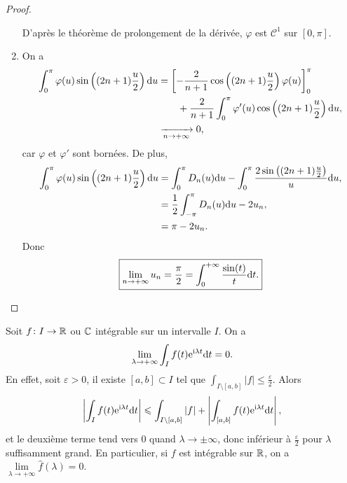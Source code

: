 \documentclass[12pt]{article}
\begin{document}
\begin{proof}
\begin{enumerate}
        D'après le théorème de prolongement de la dérivée, $\varphi$ est $\mathcal{C}^{1}$ sur $[0,\pi]$.

        \item On a 
        \begin{align*}
            \int_{0}^{\pi}\varphi(u)\sin\left((2n+1)\frac{u}{2}\right)\mathrm{d} u
            &=\left[-\frac{2}{n+1}\cos\left((2n+1)\frac{u}{2}\right)\varphi(u)\right]_{0}^{\pi}\nonumber\\
            &\qquad+\frac{2}{n+1}\int_{0}^{\pi}\varphi'(u)\cos\left((2n+1)\frac{u}{2}\right)\mathrm{d} u,\\
            &\xrightarrow[n\to+\infty]{}0,
        \end{align*}
        car $\varphi$ et $\varphi'$ sont bornées. De plus,
        \begin{align*}
            \int_{0}^{\pi}\varphi(u)\sin\left((2n+1)\frac{u}{2}\right)\mathrm{d} u
            &=\int_{0}^{\pi}D_n(u)\mathrm{d} u-\int_{0}^{\pi}\frac{2\sin\left((2n+1)\frac{u}{2}\right)}{u}\mathrm{d} u,\\
            &=\frac{1}{2}\int_{-\pi}^{\pi}D_n(u)\mathrm{d} u-2u_n,\\
            &=\pi-2u_n.
        \end{align*}
        Donc
        \begin{equation*}
            \boxed{
                \lim\limits_{n\to+\infty}u_n=\frac{\pi}{2}=\int_{0}^{+\infty}\frac{\sin(t)}{t}\mathrm{d} t.
            }
        \end{equation*}
    \end{enumerate}
\end{proof}

\begin{remark}
    Soit $f\colon I\to\mathbb{R}$ ou $\mathbb{C}$ intégrable sur un intervalle $I$. On a 
    \begin{equation*}
        \lim\limits_{\lambda\to+\infty}\int_{I}f(t)\mathrm{e}^{\mathrm{i}\lambda t}\mathrm{d} t=0.
    \end{equation*}
    En effet, soit $\varepsilon>0$, il existe $[a,b]\subset I$ tel que $\int_{I\setminus[a,b]}\left\lvert f\right\rvert\leqslant\frac{\varepsilon}{2}$. Alors 
    \begin{equation*}
        \left\lvert\int_{I}f(t)\mathrm{e}^{\mathrm{i}\lambda t}\mathrm{d} t\right\rvert\leqslant\int_{I\setminus[a,b]}\left\lvert f\right\rvert+\left\lvert\int_{[a,b]}f(t)\mathrm{e}^{\mathrm{i}\lambda t}\mathrm{d} t\right\rvert,
    \end{equation*}
    et le deuxième terme tend vers 0 quand $\lambda\to \pm\infty$, donc inférieur à $\frac{\varepsilon}{2}$ pour $\lambda$ suffisamment grand. En particulier, si $f$ est intégrable sur $\mathbb{R}$, on a $\lim\limits_{\lambda\to+\infty}\widehat{f}(\lambda)=0$.
\end{remark}
\end{document}
